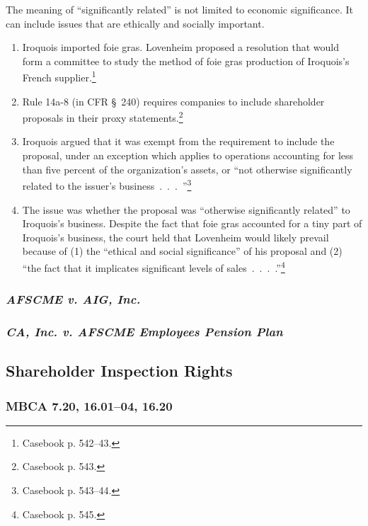 The meaning of ``significantly related'' is not limited to economic 
significance. It can include issues that are ethically and socially important.

\begin{enumerate}
    \item Iroquois imported foie gras. Lovenheim proposed a resolution that 
    would form a committee to study the method of foie gras production of 
    Iroquois's French supplier.\footnote{Casebook p. 542--43.}
    \item Rule 14a-8 (in CFR \S\ 240) requires companies to include 
    shareholder proposals in their proxy statements.\footnote{Casebook p. 
    543.}
    \item Iroquois argued that it was exempt from the requirement to include 
    the proposal, under an exception which applies to operations accounting 
    for less than five percent of the organization's assets, or ``not 
    otherwise significantly related to the issuer's 
    business~.~.~.~''\footnote{Casebook p. 543--44.}
    \item The issue was whether the proposal was ``otherwise significantly 
    related'' to Iroquois's business. Despite the fact that foie gras 
    accounted for a tiny part of Iroquois's business, the court held that 
    Lovenheim would likely prevail because of (1) the ``ethical and social 
    significance'' of his proposal and (2) ``the fact that it implicates 
    significant levels of sales~.~.~.~.''\footnote{Casebook p. 545.}
\end{enumerate}

\subsubsection{\emph{AFSCME v. AIG, Inc.}}


\subsubsection{\emph{CA, Inc. v. AFSCME Employees Pension Plan}}


\newpage %

\subsection{Shareholder Inspection Rights}

\subsubsection{MBCA 7.20, 16.01--04, 16.20}

